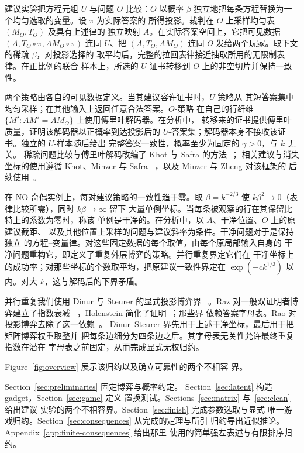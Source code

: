 建议实验把方程元组 \(U\) 与问题 \(O\) 比较：\(O\) 以概率 \(\beta\)
独立地把每条方程替换为一个均匀选取的变量。设 \(\pi\) 为实际答案的
所得投影。裁判在 \(O\) 上采样均匀表 \((M_O,T_O)\) 及具有上述律的
独立映射 \(A\)。在实际答案空间上，它把可见数据
\((A,T_O\circ\pi,AM_O\circ\pi)\) 连同 \(U\)、把 \((A,T_O,AM_O)\)
连同 \(O\) 发给两个玩家。取下文的稀疏 \(\beta\)，对投影选择的
取平均后，完整的拉回表律接近抽取所用的无限制表律。在正比例的联合
样本上，所选的 \(U\)-证书转移到 \(O\) 上的非空切片并保持一致性。

两个策略由各自的可见数据定义。当其建议容许证书时，\(U\)-策略从
其短答案集中均匀采样；在其他输入上返回任意合法答案。\(O\)-策略
在自己的行纤维 \(\{M':AM'=AM_O\}\) 上使用傅里叶解码器。在分析中，
转移来的证书提供傅里叶质量，证明该解码器以正概率到达投影后的
\(U\)-答案集；解码器本身不接收该证书。独立的 \(U\)-样本随后给出
完整答案一致性，概率至少为固定的 \(\gamma>0\)，与 \(k\) 无关。
稀疏问题比较与傅里叶解码改编了 Khot 与 Safra 的方法~\cite{KS13}；
相关建议与消失坐标的使用遵循 Khot、Minzer 与 Safra
~\cite[Sections~3.3--3.4]{KMS17}，以及 Minzer 与 Zheng 对该框架的
后续使用~\cite[Section~3]{MZ26}。

在 NO 奇偶实例上，每对建议策略的一致性趋于零。取 \(\beta=k^{-2/3}\)
使 \(k\beta^2\to0\)（表律比较所需），同时 \(k\beta\to\infty\) 留下
大量单例坐标。当每条被观察的行在其保留比特上的系数为零时，称该
单例是干净的。在分析中，以 \(A\)、干净位置、\(O\) 上的原建议截距、
以及其他位置上采样的问题与建议斜率为条件。干净问题对于是保持独立
的方程–变量律。对这些固定数据的每个取值，由每个原局部输入自身的
干净问题重构它，即定义了重复外层博弈的策略。并行重复界定它们在
干净坐标上的成功率；对那些坐标的个数取平均，把原建议一致性界定在
\(\exp(-c k^{1/3})\) 以内。对大 \(k\)，这与解码后的下界矛盾。

并行重复我们使用 Dinur 与 Steurer 的显式投影博弈界
~\cite[Corollary~1.2]{DS14}。Raz 对一般双证明者博弈建立了指数衰减
~\cite{Raz98}，Holenstein 简化了证明~\cite{Holenstein2009}；那些界
依赖答案字母表。Rao 对投影博弈去除了这一依赖~\cite[Theorem~4]{Rao11}。
Dinur--Steurer 界先用于上述干净坐标，最后用于把矩阵博弈权重取整并
把每条边细分为四条边之后。其字母表无关性允许最终重复指数在潜在
字母表之前固定，从而完成显式无权归约。

Figure~\ref{fig:overview} 展示该归约以及确立可靠性的两个不相容
界。


Section~\ref{sec:preliminaries} 固定博弈与概率约定。
Section~\ref{sec:latent} 构造 gadget，Section~\ref{sec:game} 定义
置换测试。Sections~\ref{sec:matrix} 与~\ref{sec:clean} 给出建议
实验的两个不相容界。Section~\ref{sec:finish} 完成参数选取与显式
唯一游戏归约。Section~\ref{sec:consequences} 从完成的定理与所引
归约导出近似推论。Appendix~\ref{app:finite-consequences} 给出那里
使用的简单强左表述与有限排序归约。
